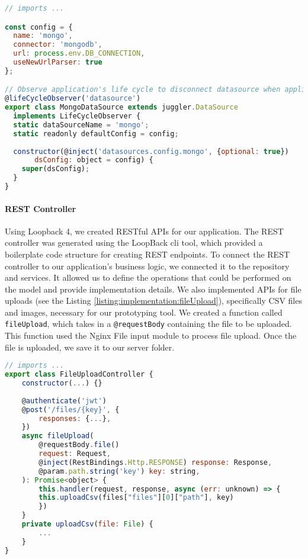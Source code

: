 \begin{lstlisting}[language=JavaScript, caption=lb-4-mongo.datasource.ts, label=listing:implementation:lb4Mongo]
// imports ...

const config = {
  name: 'mongo',
  connector: 'mongodb',
  url: process.env.DB_CONNECTION,
  useNewUrlParser: true
};

// Observe application's life cycle to disconnect datasource when application is stopped
@lifeCycleObserver('datasource')
export class MongoDataSource extends juggler.DataSource
  implements LifeCycleObserver {
  static dataSourceName = 'mongo';
  static readonly defaultConfig = config;
    
  constructor(@inject('datasources.config.mongo', {optional: true})
       dsConfig: object = config) {
    super(dsConfig);
  }
}
\end{lstlisting}

\paragraph{REST Controller}
Using Loopback 4, we created RESTful APIs for our application. 
The REST controller was generated using the LoopBack \ac{cli} tool, which provided a boilerplate code structure for creating REST endpoints.
To connect the REST controller to our application's business logic, we connected it to the repository and services. 
It allowed us to define the operations that could be performed on the model and provide implementation details.
We also implemented APIs for file uploads (see the Listing \ref{listing:implementation:fileUpload}), specifically CSV files and images, necessary for our prototyping tool. 
We created a function called \texttt{fileUpload}, which takes in a \texttt{@requestBody} containing the file to be uploaded. 
This function used the Nginx File input module to process file upload. 
Once the file is uploaded, we save it to our server folder.

\begin{lstlisting}[language=JavaScript, caption=file-upload.controller.ts, label=listing:implementation:fileUpload]
// imports ...
export class FileUploadController {
    constructor(...) {}
    
    @authenticate('jwt')
    @post('/files/{key}', {
        responses: {...},
    })
    async fileUpload(
        @requestBody.file()
        request: Request,
        @inject(RestBindings.Http.RESPONSE) response: Response,
        @param.path.string('key') key: string,
    ): Promise<object> {
        this.handler(request, response, async (err: unknown) => {
        this.uploadCsv(files["files"][0]["path"], key)
        })
    }
    private uploadCsv(file: File) {
        ...
    }
}
\end{lstlisting}

